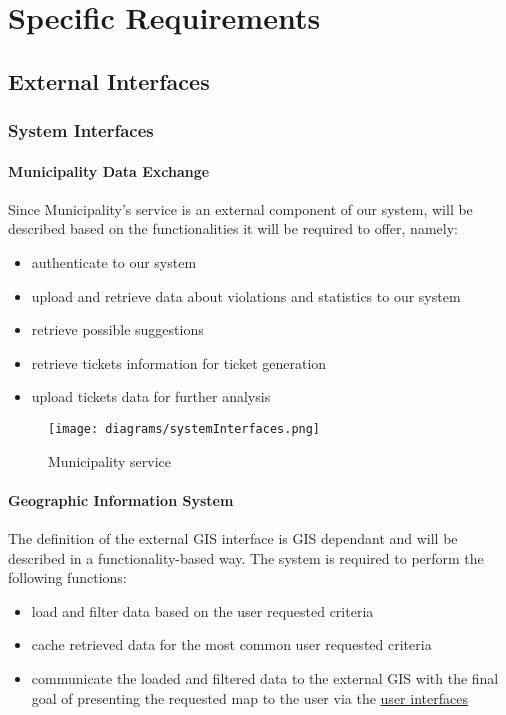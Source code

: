 \section{Specific Requirements}

\subsection{External Interfaces}

\subsubsection{System Interfaces}

\paragraph{Municipality Data Exchange} Since Municipality's service 	is an external component of our system, will be described based on the functionalities it will be required to offer, namely:
	\begin{itemize}
		\item authenticate to our system
		\item upload and retrieve data about violations and statistics to our system
		\item retrieve possible suggestions
		\item retrieve tickets information for ticket generation
		\item upload tickets data for further analysis
	\end{itemize}

	\begin{figure}[h]
		\centering
		\texttt{[image: diagrams/systemInterfaces.png]}
		\caption{
			\label{fig:municipalityServiceUML} Municipality service}
	\end{figure}

\paragraph{Geographic Information System} The definition of the external GIS interface is GIS dependant and will be described in a functionality-based way. The system is required to perform the following functions:

	\begin{itemize}
		\item load and filter data based on the user requested criteria
		\item cache retrieved data for the most common user requested criteria
		\item communicate the loaded and filtered data to the external GIS with the final goal of presenting the requested map to the user via the \hyperref[sec:3userinterface]{user interfaces}
	\end{itemize}
	
